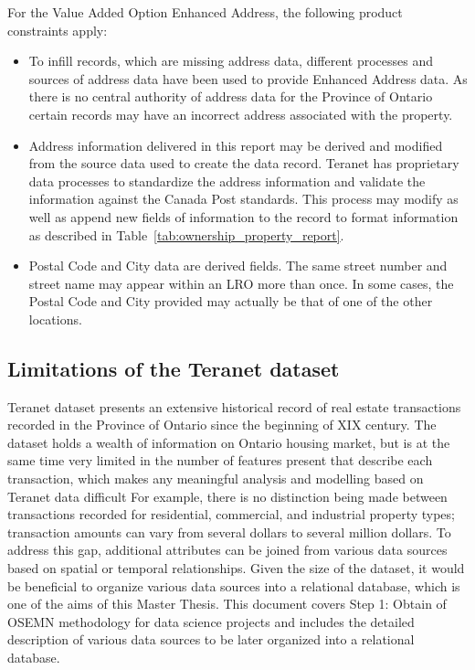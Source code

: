 For the Value Added Option \textemdash Enhanced Address, the following product constraints apply:
\begin{itemize}
    \item To infill records, which are missing address data, different processes and sources of address data have been used to provide Enhanced Address data.
    As there is no central authority of address data for the Province of Ontario certain records may have an incorrect address associated with the property.
    \item Address information delivered in this report may be derived and modified from the source data used to create the data record.
    Teranet has proprietary data processes to standardize the address information and validate the information against the Canada Post standards.
    This process may modify as well as append new fields of information to the record to format information as described in Table~\ref{tab:ownership_property_report}.
    \item Postal Code and City data are derived fields.
    The same street number and street name may appear within an LRO more than once.
    In some cases, the Postal Code and City provided may actually be that of one of the other locations.
\end{itemize}

\subsection{Limitations of the Teranet dataset} \label{subsec:teranet_limitations}

Teranet dataset presents an extensive historical record of real estate transactions recorded in the Province of Ontario since the beginning of XIX century.
The dataset holds a wealth of information on Ontario housing market, but is at the same time very limited in the number of features present that describe each transaction, which makes any meaningful analysis and modelling based on Teranet data difficult
For example, there is no distinction being made between transactions recorded for residential, commercial, and industrial property types;
transaction amounts can vary from several dollars to several million dollars.
To address this gap, additional attributes can be joined from various data sources based on spatial or temporal relationships.
Given the size of the dataset, it would be beneficial to organize various data sources into a relational database, which is one of the aims of this Master Thesis.
This document covers Step 1: Obtain of OSEMN methodology for data science projects and includes the detailed description of various data sources to be later organized into a relational database.

